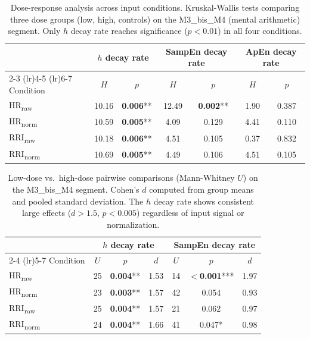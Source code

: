 \begin{table}[htbp]
\centering
\caption{Dose-response analysis across input conditions.
Kruskal-Wallis tests comparing three dose groups (low, high, controls)
on the M3\_bis\_M4 (mental arithmetic) segment.
Only $h$ decay rate reaches significance ($p < 0.01$) in all four conditions.}
\label{tab:robustness_kw}
\small
\begin{tabular}{l cc cc cc}
\toprule
& \multicolumn{2}{c}{$h$ decay rate} & \multicolumn{2}{c}{SampEn decay rate} & \multicolumn{2}{c}{ApEn decay rate} \\
\cmidrule(lr){2-3} \cmidrule(lr){4-5} \cmidrule(lr){6-7}
Condition & $H$ & $p$ & $H$ & $p$ & $H$ & $p$ \\
\midrule
HR\textsubscript{raw}  & 10.16 & \textbf{0.006}** & 12.49 & \textbf{0.002}** & 1.90 & 0.387 \\
HR\textsubscript{norm} & 10.59 & \textbf{0.005}** & 4.09  & 0.129              & 4.41 & 0.110 \\
RRI\textsubscript{raw} & 10.18 & \textbf{0.006}** & 4.51  & 0.105              & 0.37 & 0.832 \\
RRI\textsubscript{norm}& 10.69 & \textbf{0.005}** & 4.49  & 0.106              & 4.51 & 0.105 \\
\bottomrule
\end{tabular}
\end{table}

\begin{table}[htbp]
\centering
\caption{Low-dose vs.\ high-dose pairwise comparisons (Mann-Whitney $U$)
on the M3\_bis\_M4 segment. Cohen's $d$ computed from group means and
pooled standard deviation. The $h$ decay rate shows consistent large effects
($d > 1.5$, $p < 0.005$) regardless of input signal or normalization.}
\label{tab:robustness_pairwise}
\small
\begin{tabular}{l ccc ccc}
\toprule
& \multicolumn{3}{c}{$h$ decay rate} & \multicolumn{3}{c}{SampEn decay rate} \\
\cmidrule(lr){2-4} \cmidrule(lr){5-7}
Condition & $U$ & $p$ & $d$ & $U$ & $p$ & $d$ \\
\midrule
HR\textsubscript{raw}  & 25 & \textbf{0.004}** & 1.53 & 14 & \textbf{$<$0.001}*** & 1.97 \\
HR\textsubscript{norm} & 23 & \textbf{0.003}** & 1.57 & 42 & 0.054                 & 0.93 \\
RRI\textsubscript{raw} & 25 & \textbf{0.004}** & 1.57 & 21 & 0.062                 & 0.97 \\
RRI\textsubscript{norm}& 24 & \textbf{0.004}** & 1.66 & 41 & 0.047*                & 0.98 \\
\bottomrule
\end{tabular}
\end{table}
